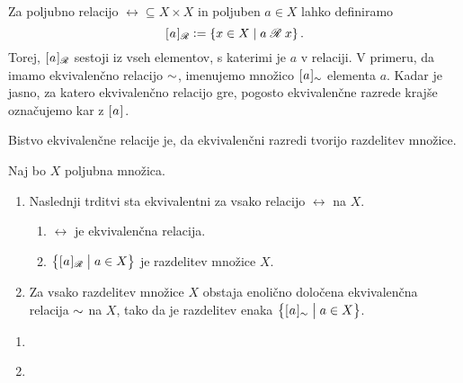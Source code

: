                 Za poljubno relacijo $\rel \subseteq X \times X$ in poljuben $a \in X$ lahko definiramo
                \[\ec[\rel]{a} \dfeq \set{x \in X}{\rel[a][x]}.\]
                Torej, $\ec[\rel]{a}$ sestoji iz vseh elementov, s katerimi je $a$ v relaciji. V primeru, da imamo ekvivalenčno relacijo $\equ$, imenujemo množico $\ec[\equ]{a}$  elementa $a$. Kadar je jasno, za katero ekvivalenčno relacijo gre, pogosto ekvivalenčne razrede krajše označujemo kar z $\ec{a}$.

                Bistvo ekvivalenčne relacije je, da ekvivalenčni razredi tvorijo razdelitev množice.


                \begin{izrek}
                        Naj bo $X$ poljubna množica.
                        \begin{enumerate}
                                \item
                                        Naslednji trditvi sta ekvivalentni za vsako relacijo $\rel$ na $X$.
                                        \begin{enumerate}
                                                \item
                                                        $\rel$ je ekvivalenčna relacija.
                                                \item
                                                        $\set[1]{\ec[\rel]{a}}{a \in X}$ je razdelitev množice $X$.
                                        \end{enumerate}
                                \item
                                        Za vsako razdelitev množice $X$ obstaja enolično določena ekvivalenčna relacija $\equ$ na $X$, tako da je razdelitev enaka $\set[1]{\ec[\equ]{a}}{a \in X}$.
                        \end{enumerate}
                \end{izrek}

                \begin{dokaz}
                        \begin{enumerate}
                                \item
                                        \begin{implproof}{}{}
                                        \end{implproof}
                                        \begin{implproof}{}{}
                                        \end{implproof}
                                \item
                        \end{enumerate}
                \end{dokaz}

